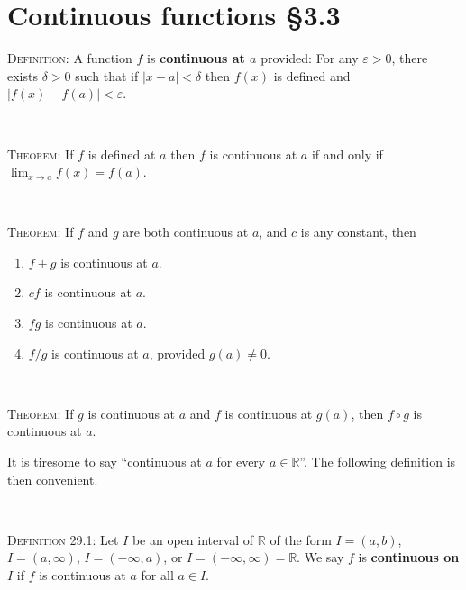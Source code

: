 \documentclass[12pt]{amsart}
\newcommand{\R}{\mathbb{R}}
\newcommand{\e}{\varepsilon}
\newcommand{\de}{\delta}
\newcommand{\ds}{\displaystyle}
\begin{document}
	
	
	\thispagestyle{empty}
	
	\section*{Continuous functions \S 3.3}
	
	\begin{framed}
\noindent \textsc{Definition:}  A function $f$ is \textbf{continuous at $a$} provided: For any $\e>0$, there exists $\de>0$ such that if $|x-a|<\de$ then $f(x)$ is defined and $|f(x)-f(a)|<\e$.

\

\noindent \textsc{Theorem:} If $f$ is defined at $a$ then $f$ is continuous at $a$ if and only if $\ds\lim_{x\to a} f(x) = f(a)$.

\

\noindent \textsc{Theorem:} If $f$ and $g$ are both continuous at $a$, and $c$ is any constant, then
\begin{enumerate}
\item $f+g$ is continuous at $a$.
\item $cf$ is continuous at $a$.
\item $fg$ is continuous at $a$.
\item $f/g$ is continuous at $a$, provided $g(a)\neq 0$.
\end{enumerate}

\

\noindent \textsc{Theorem:} If $g$ is continuous at $a$ and $f$ is continuous at $g(a)$, then $f\circ g$ is continuous at $a$.

\noindent \hrulefill

\noindent It is tiresome to say ``continuous at $a$ for every $a\in \R$''. The following definition is then convenient.

\

\noindent \textsc{Definition 29.1:}  Let $I$ be an open interval of $\R$ of the form $I=(a,b)$, $I=(a,\infty)$, $I=(-\infty,a)$, or $I=(-\infty,\infty)=\R$. We say $f$ is \textbf{continuous on $I$} if $f$ is continuous at $a$ for all $a\in I$. 



\end{framed}

\
\end{document}
